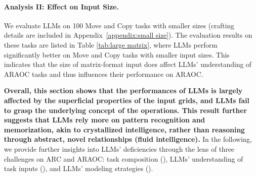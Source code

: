 \paragraph{Analysis II: Effect on Input Size.}
We %
evaluate LLMs on 100 Move and Copy tasks with smaller sizes (crafting details are included in Appendix~\ref{appendix:small size}). 
The evaluation results on these tasks are listed in Table \ref{tab:large matrix}, where LLMs perform significantly better on Move and Copy tasks with smaller input sizes. This indicates that the size of matrix-format input does affect LLMs' understanding of ARAOC tasks and thus influences their performance on ARAOC. %

\textbf{Overall, this section shows that the performances of LLMs is largely affected by the superficial properties of the input grids, 
and LLMs fail to grasp the underlying concept of the operations. This result further suggests that LLMs rely more on pattern recognition and memorization, akin to crystallized intelligence, rather than reasoning through abstract, novel relationships (fluid intelligence).}
In the following, we provide further insights into LLMs' deficiencies through the lens of three challenges on ARC and ARAOC: task composition (), LLMs' understanding of task inputs (), and LLMs' modeling strategies ().





